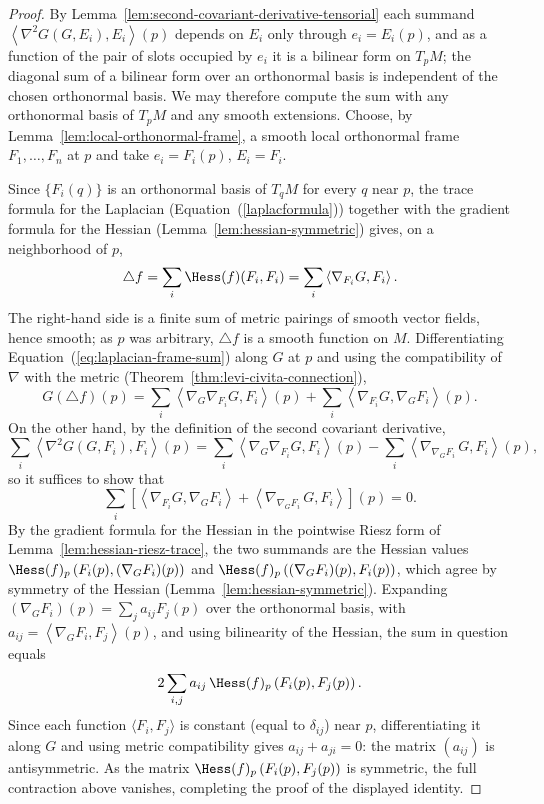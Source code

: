\begin{proof}
\leanok
By Lemma~\ref{lem:second-covariant-derivative-tensorial} each summand
$\left\langle\nabla^2G(G,E_i),E_i\right\rangle(p)$ depends on $E_i$
only through $e_i=E_i(p)$, and as a function of the pair of slots
occupied by $e_i$ it is a bilinear form on $T_pM$; the diagonal sum of
a bilinear form over an orthonormal basis is independent of the chosen
orthonormal basis. We may therefore compute the sum with any
orthonormal basis of $T_pM$ and any smooth extensions. Choose, by
Lemma~\ref{lem:local-orthonormal-frame}, a smooth local orthonormal
frame $F_1,\ldots,F_n$ at $p$ and take $e_i=F_i(p)$, $E_i=F_i$.

Since $\{F_i(q)\}$ is an orthonormal basis of $T_qM$ for every $q$
near $p$, the trace formula for the Laplacian
(Equation~(\ref{laplacformula})) together with the gradient formula
for the Hessian (Lemma~\ref{lem:hessian-symmetric}) gives, on a
neighborhood of $p$,
\begin{equation}\label{eq:laplacian-frame-sum}
\triangle f=\sum_i\Hess(f)(F_i,F_i)
=\sum_i\left\langle\nabla_{F_i}G,F_i\right\rangle .
\end{equation}
The right-hand side is a finite sum of metric pairings of smooth
vector fields, hence smooth; as $p$ was arbitrary, $\triangle f$ is a
smooth function on $M$. Differentiating
Equation~(\ref{eq:laplacian-frame-sum}) along $G$ at $p$ and using the
compatibility of $\nabla$ with the metric
(Theorem~\ref{thm:levi-civita-connection}),
$$G(\triangle f)(p)
=\sum_i\left\langle\nabla_G\nabla_{F_i}G,F_i\right\rangle(p)
+\sum_i\left\langle\nabla_{F_i}G,\nabla_GF_i\right\rangle(p).$$
On the other hand, by the definition of the second covariant
derivative,
$$\sum_i\left\langle\nabla^2G(G,F_i),F_i\right\rangle(p)
=\sum_i\left\langle\nabla_G\nabla_{F_i}G,F_i\right\rangle(p)
-\sum_i\left\langle\nabla_{\nabla_GF_i}\,G,F_i\right\rangle(p),$$
so it suffices to show that
$$\sum_i\left[\left\langle\nabla_{F_i}G,\nabla_GF_i\right\rangle
+\left\langle\nabla_{\nabla_GF_i}\,G,F_i\right\rangle\right](p)=0.$$
By the gradient formula for the Hessian in the pointwise Riesz form of
Lemma~\ref{lem:hessian-riesz-trace}, the two summands are the Hessian
values $\Hess(f)_p\left(F_i(p),(\nabla_GF_i)(p)\right)$ and
$\Hess(f)_p\left((\nabla_GF_i)(p),F_i(p)\right)$, which agree by
symmetry of the Hessian (Lemma~\ref{lem:hessian-symmetric}). Expanding
$(\nabla_GF_i)(p)=\sum_ja_{ij}F_j(p)$ over the orthonormal basis, with
$a_{ij}=\left\langle\nabla_GF_i,F_j\right\rangle(p)$, and using
bilinearity of the Hessian, the sum in question equals
$$2\sum_{i,j}a_{ij}\,\Hess(f)_p\left(F_i(p),F_j(p)\right).$$
Since each function $\langle F_i,F_j\rangle$ is constant (equal to
$\delta_{ij}$) near $p$, differentiating it along $G$ and using metric
compatibility gives $a_{ij}+a_{ji}=0$: the matrix $(a_{ij})$ is
antisymmetric. As the matrix
$\Hess(f)_p\left(F_i(p),F_j(p)\right)$ is symmetric, the full
contraction above vanishes, completing the proof of the displayed
identity.
\end{proof}


